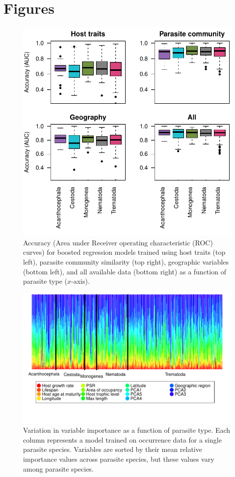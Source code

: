 \documentclass[12pt]{article}
\begin{document}
\section{Figures}
\begin{figure}[h]
  \includegraphics[width=\textwidth]{../Figures/parAccuracy.pdf}
  \caption{Accuracy (Area under Receiver operating characteristic (ROC) curves) for boosted regression models trained using host traits (top left), parasite community similarity (top right), geographic variables (bottom left), and all available data (bottom right) as a function of parasite type ($x$-axis). }
 \label{fig:parAUC}
 \end{figure}

 
  
 
 \newpage
 \begin{figure}[h!]
  \includegraphics[width=\textwidth]{../Figures/parTypeColor.pdf}
  \caption{Variation in variable importance as a function of parasite type. Each column represents a model trained on occurrence data for a single parasite species. Variables are sorted by their mean relative importance values across parasite species, but these values vary among parasite species.}
 \label{fig:parType}
 \end{figure}
\end{document}
